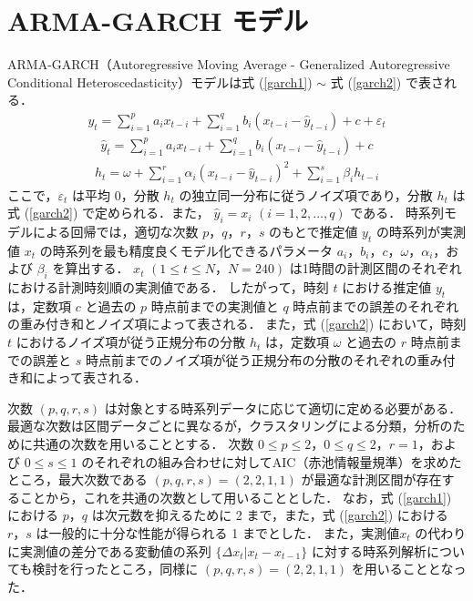 \documentclass[a4j]{jarticle}
\begin{document}
\section{ARMA-GARCH モデル}
 ARMA-GARCH（Autoregressive Moving Average - Generalized Autoregressive Conditional Heteroscedasticity）モデル\cite{lamoureux1990persistence}は式 (\ref{garch1}) $\sim$ 式 (\ref{garch2}) で表される．
\begin{eqnarray}
y_t = \sum_{i=1}^p a_i x_{t-i} + \sum_{i=1}^q b_i (x_{t-i} - \widehat{y}_{t-i}) + c + \varepsilon_{t} 
\label{garch1}
\end{eqnarray}
\begin{eqnarray}
\widehat{y}_t = \sum_{i=1}^p a_i x_{t-i} + \sum_{i=1}^q b_i (x_{t-i} - \widehat{y}_{t-i}) + c
\end{eqnarray}
\begin{eqnarray}
\displaystyle h_{t} = \omega + \sum_{i=1}^{r}\alpha_i(x_{t-i} - \widehat{y}_{t-i})^2 + \sum_{i=1}^{s}\beta_ih_{t-i}
\label{garch2}
\end{eqnarray}
ここで，$\varepsilon_t$ は平均 0，分散 $h_t$ の独立同一分布に従うノイズ項であり，分散 $h_t$ は式 (\ref{garch2}) で定められる．また， $\widehat{y}_i = x_i$ $(i = 1,2,\ldots,q)$ である．
時系列モデルによる回帰では，適切な次数 $p，q，r，s$ のもとで推定値 $y_t$ の時系列が実測値 $x_t$ の時系列を最も精度良くモデル化できるパラメータ $a_i，b_i，c，\omega，\alpha_i，$および $\beta_i$ を算出する．
$x_t$ $(1\leq t\leq N，N=240)$ は1時間の計測区間のそれぞれにおける計測時刻順の実測値である．
したがって，時刻 $t$ における推定値 $y_t$ は，定数項 $c$ と過去の $p$ 時点前までの実測値と $q$ 時点前までの誤差のそれぞれの重み付き和とノイズ項によって表される．
また，式 (\ref{garch2}) において，時刻 $t$ におけるノイズ項が従う正規分布の分散 $h_t$ は，定数項 $\omega$ と過去の $r$ 時点前までの誤差と $s$ 時点前までのノイズ項が従う正規分布の分散のそれぞれの重み付き和によって表される．

次数 $(p,q,r,s)$ は対象とする時系列データに応じて適切に定める必要がある．
最適な次数は区間データごとに異なるが，クラスタリングによる分類，分析のために共通の次数を用いることとする．
次数 $0\leq p\leq2，0\leq q\leq 2，r=1$，および $0\leq s\leq 1$ のそれぞれの組み合わせに対してAIC（赤池情報量規準）\cite{bozdogan1987model}\cite{burnham2004multimodel}を求めたところ，最大次数である $(p,q,r,s)=(2,2,1,1)$ が最適な計測区間が存在することから，これを共通の次数として用いることとした．
なお，式 (\ref{garch1}) における $p，q$ は次元数を抑えるために 2 まで，また，式 (\ref{garch2}) における $r，s$ は一般的に十分な性能が得られる 1 までとした\cite{hansen2005forecast}．
また，実測値$ x_t$ の代わりに実測値の差分である変動値の系列 $\{\Delta x_t | x_t - x_{t-1} \}$ に対する時系列解析についても検討を行ったところ，同様に $(p,q,r,s)=(2,2,1,1)$ を用いることとなった．
\end{document}

